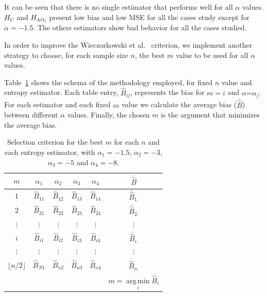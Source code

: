 \documentclass[journal]{IEEEtran}
\DeclareMathOperator*{\argmin}{arg\,min}
\begin{document}

It can be seen that there is no single estimator that performs well for all $\alpha$ values. 
$H_\text{C}$ and $H_{\text{AO}_1}$ present low bias and low MSE for all the cases study except for $\alpha=-1.5$. 
The others estimators show bad behavior for all the cases studied.	

In order to improve the Wieczorkowski et al.~\cite{Wieczorkowski1999} criterion, we implement another strategy to choose, for each sample size $n$, the best $m$ value to be used for all $\alpha$ values.

Table~\ref{tab:eleccion_mejor_m} shows the schema of the methodology employed, for fixed $n$ value and entropy estimator. 
Each table entry, $\widehat{B}_{ij}$, represents the bias for $m=i$ and $\alpha \text{=} \alpha_j$. 
For each estimator and each fixed $m$ value we calculate the average bias ($\overline{\widehat{B}}$) between different $\alpha$ values. Finally, the chosen $m$ is the argument that minimizes the average bias.

\begin{table}[hbt]
	\caption{Selection criterion for the best $m$ for each $n$ and each entropy estimator, with $\alpha_1= -1.5$, $\alpha_2=-3$, $\alpha_3=-5$ and $\alpha_4=-8$.}
	\label{tab:eleccion_mejor_m}
	\centering
	\begin{tabular}{c c c c c c}
		\toprule
		$m$	& $\alpha_{1}$ & $\alpha_{2}$
		& $\alpha_{3}$
		& $\alpha_{4}$ & $\overline{\widehat{B}}$ \\
		
		\midrule
		$1$	& $\widehat{B}_{11}$ & $\widehat{B}_{12}$ & $\widehat{B}_{13}$ & $\widehat{B}_{14}$ & $\overline{\widehat{B}}_{1.}$\\
		
		$2$	& $\widehat{B}_{21}$ & $\widehat{B}_{22}$ & $\widehat{B}_{23}$ & $\widehat{B}_{24}$ & $\overline{\widehat{B}}_{2.}$\\
		$\vdots$ & $\vdots$ & $\vdots$ & $\vdots$ & $\vdots$ & $\vdots$ \\
		
		$i$ & $\widehat{B}_{i1}$ & $\widehat{B}_{i2}$ & $\widehat{B}_{i3}$ & $\widehat{B}_{i4}$ & $\overline{\widehat{B}}_{i.}$\\
		$\vdots$ & $\vdots$ & $\vdots$ & $\vdots$ & $\vdots$ & $\vdots$\\
		
		$\lfloor n/2 \rfloor$ & $\widehat{B}_{N1}$ & $\widehat{B}_{n2}$ & $\widehat{B}_{n3}$ & $\widehat{B}_{n4}$ & $\overline{\widehat{B}}_{n.}$\\
		\bottomrule
		& & & & & $m=\argmin\limits_{i} \overline{\widehat{B}}_{i}$\\
		
		\bottomrule
	\end{tabular}
\end{table}	
\end{document}
